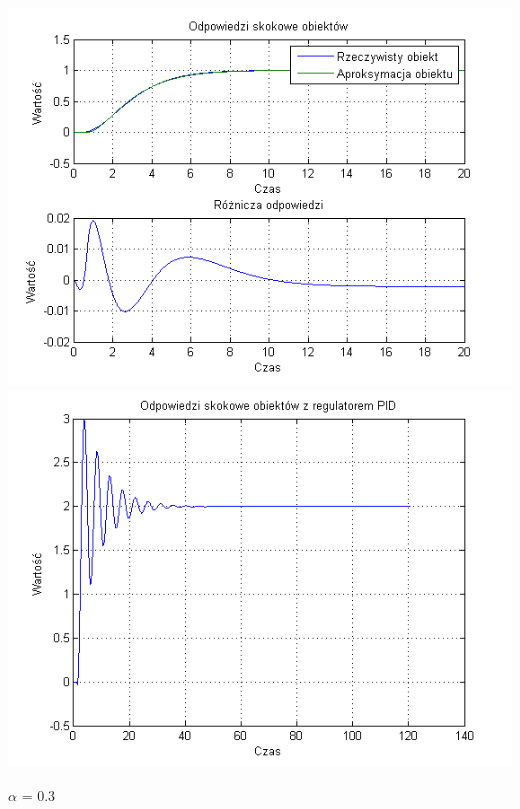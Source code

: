 \documentclass[10pt,a4paper]{article}
\begin{document}
\begin{center}
\includegraphics[scale=1]{images/dwa/skrypt_227.png}\\
\includegraphics[scale=1]{images/dwa/skrypt_228.png}\\
\end{center}
\newpage
$\alpha$ = 0.3
\end{document}
